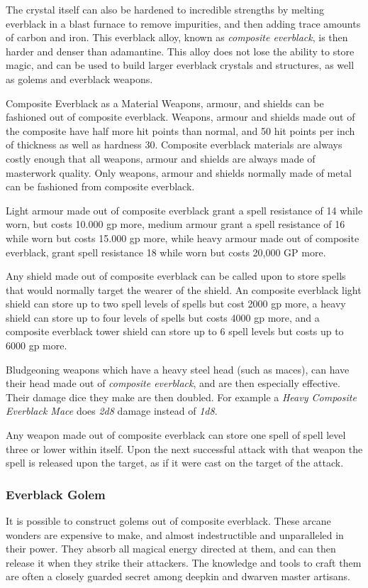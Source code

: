 The crystal itself can also be hardened to incredible strengths by melting
everblack in a blast furnace to remove impurities, and then adding trace
amounts of carbon and iron. This everblack alloy, known as \emph{composite
everblack}, is then harder and denser than adamantine. This alloy does not lose
the ability to store magic, and can be used to build larger everblack crystals
and structures, as well as golems and everblack weapons.

\begin{35e}{Composite Everblack as a Material}
  Weapons, armour, and shields can be fashioned out of composite everblack.
  Weapons, armour and shields made out of the composite have half more hit
  points than normal, and 50 hit points per inch of thickness as well as
  hardness 30. Composite everblack materials are always costly enough that all
  weapons, armour and shields are always made of masterwork quality.  Only
  weapons, armour and shields normally made of metal can be fashioned from
  composite everblack.

  Light armour made out of composite everblack grant a spell resistance of 14
  while worn, but costs 10.000 gp more, medium armour grant a spell resistance
  of 16 while worn but costs 15.000 gp more, while heavy armour made out of
  composite everblack, grant spell resistance 18 while worn but costs 20,000
  GP more.

  Any shield made out of composite everblack can be called upon to store
  spells that would normally target the wearer of the shield. An composite
  everblack light shield can store up to two spell levels of spells but cost
  2000 gp more, a heavy shield can store up to four levels of spells but costs
  4000 gp more, and a composite everblack tower shield can store up to 6 spell
  levels but costs up to 6000 gp more.

  Bludgeoning weapons which have a heavy steel head (such as maces), can have
  their head made out of \emph{composite everblack}, and are then especially
  effective. Their damage dice they make are then doubled. For example a
  \emph{Heavy Composite Everblack Mace} does \emph{2d8} damage instead of
  \emph{1d8}.

  Any weapon made out of composite everblack can store one spell of spell
  level three or lower within itself. Upon the next successful attack with
  that weapon the spell is released upon the target, as if it were cast on
  the target of the attack.
\end{35e}

\subsubsection{Everblack Golem}
\label{sec:Everblack Golem}

It is possible to construct golems out of composite everblack. These arcane
wonders are expensive to make, and almost indestructible and unparalleled in
their power. They absorb all magical energy directed at them, and can then
release it when they strike their attackers. The knowledge and tools to craft
them are often a closely guarded secret among deepkin and dwarven master
artisans.
